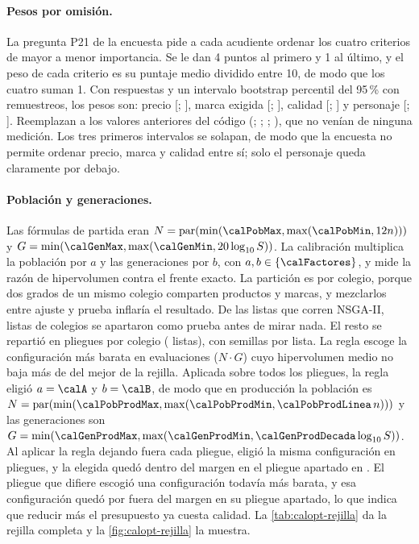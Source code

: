 \paragraph{Pesos por omisión.} La pregunta P21 de la encuesta pide a cada
acudiente ordenar los cuatro criterios de mayor a menor importancia. Se le dan
4 puntos al primero y 1 al último, y el peso de cada criterio es su puntaje
medio dividido entre 10, de modo que los cuatro suman 1. Con
\calEncuestados{} respuestas y un intervalo bootstrap percentil del 95\,\%
\cite{efron_bootstrap_1979} con \calRemuestreos{} remuestreos, los pesos son:
precio \calWPrecio{} [\calWPrecioBajo; \calWPrecioAlto], marca exigida
\calWMarca{} [\calWMarcaBajo; \calWMarcaAlto], calidad \calWCalidad{}
[\calWCalidadBajo; \calWCalidadAlto] y personaje \calWPersonaje{}
[\calWPersonajeBajo; \calWPersonajeAlto]. Reemplazan a los valores anteriores
del código (\calWPrecioAntes; \calWMarcaAntes; \calWCalidadAntes;
\calWPersonajeAntes), que no venían de ninguna medición. Los tres primeros
intervalos se solapan, de modo que la encuesta no permite ordenar precio, marca
y calidad entre sí; solo el personaje queda claramente por debajo.

\paragraph{Población y generaciones.} Las fórmulas de partida eran
$N=\mathrm{par}(\min(\calPobMax,\max(\calPobMin,12n)))$ y
$G=\min(\calGenMax,\max(\calGenMin,20\log_{10}S))$. La calibración multiplica
la población por $a$ y las generaciones por $b$, con $a,b\in\{\calFactores\}$,
y mide la razón de hipervolumen contra el frente exacto. La partición es por
colegio, porque dos grados de un mismo colegio comparten productos y marcas, y
mezclarlos entre ajuste y prueba inflaría el resultado. De las
\calGrandes{} listas que corren NSGA-II, \calPrueba{} listas de
\calColegiosPrueba{} colegios se apartaron como prueba antes de mirar nada. El
resto se repartió en \calPliegues{} pliegues por colegio (\calPlieguesListas{}
listas), con \calSemillasCV{} semillas por lista. La regla escoge la
configuración más barata en evaluaciones ($N\cdot G$) cuyo hipervolumen medio
no baja más de \calUmbralHV{} del mejor de la rejilla. Aplicada sobre todos
los pliegues, la regla eligió $a=\calA$ y $b=\calB$, de modo que en
producción la población es
$N=\mathrm{par}(\min(\calPobProdMax,\max(\calPobProdMin,\calPobProdLinea\,n)))$
y las generaciones son
$G=\min(\calGenProdMax,\max(\calGenProdMin,\calGenProdDecada\log_{10}S))$.
Al aplicar la regla dejando fuera cada pliegue, eligió la misma configuración
en \calPlieguesIguales{} pliegues, y la elegida quedó dentro del margen en el
pliegue apartado en \calPlieguesDentro. El pliegue que difiere escogió una
configuración todavía más barata, y esa configuración quedó por fuera del margen
en su pliegue apartado, lo que indica que reducir más el presupuesto ya cuesta
calidad. La \cref{tab:calopt-rejilla} da la rejilla completa y la
\cref{fig:calopt-rejilla} la muestra.

